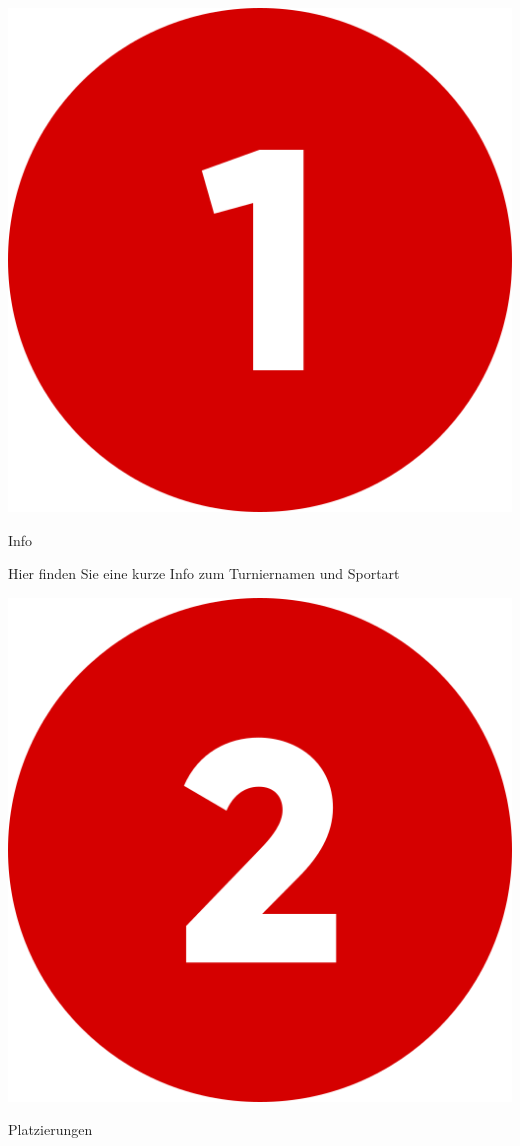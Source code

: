 \bigskip
\includegraphics[scale=0.05]{pics/user-guide/numbers/number-1.png} \begin{LARGE} Info \end{LARGE}

Hier finden Sie eine kurze Info zum Turniernamen und Sportart

\bigskip
\includegraphics[scale=0.05]{pics/user-guide/numbers/number-2.png} \begin{LARGE} Platzierungen \end{LARGE}

